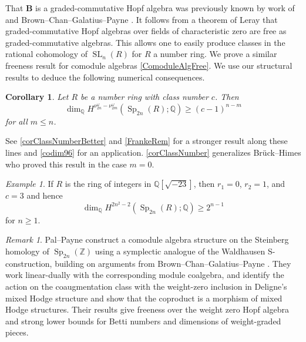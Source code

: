 \documentclass[11pt,letterpaper]{amsart}
\DeclareMathOperator{\Sp}{Sp}
\newcommand{\HH}{\mathbf{B}}
\newcommand{\Q}{\mathbb{Q}}
\numberwithin{theoremcounter}{section}
\newtheorem{corollary}[corollaryauto]{Corollary}
\theoremstyle{definition}
\theoremstyle{remark}
\newtheorem{example}[exampleauto]{Example}
\newtheorem{remark}[remarkauto]{Remark}
\DeclareMathOperator{\SL}{SL}
\begin{document}
That $\HH$ is a graded-commutative Hopf algebra was previously known by work of \cite{AMP} and Brown--Chan--Galatius--Payne \cite{BCGP}. It follows from a theorem of Leray that graded-commutative Hopf algebras over fields of characteristic zero are free as graded-commutative algebras. This allows one to easily produce classes in the rational cohomology of $\SL_n(R)$ for $R$ a number ring. We prove a similar freeness result for comodule algebras \autoref{ComoduleAlgFree}. We use our structural results to deduce the following numerical consequences. 



\begin{corollary} \label{corClassNumber} Let $R$ be a number ring with class number $c$. Then $$\dim_{\Q} H^{\nu_{2n}^\omega -\nu^\omega_{2m}}(\Sp_{2n}(R);\Q) \geq (c-1)^{n-m}$$ for all $m \leq n$.



     
     
\end{corollary}

See \autoref{corClassNumberBetter} and \autoref{FrankeRem} for a stronger result along these lines and \autoref{codim96} for an application.
\autoref{corClassNumber} generalizes Br\"uck--Himes \cite[Theorem 1.1]{BH} who proved this result in the case $m=0$. 

\begin{example}
    If $R$ is the ring of integers in $\Q[\sqrt{-23}]$, then $r_1=0$, $r_2=1$, and $c=3$ and hence 
$$\dim_\Q H^{2n^2-2}(\Sp_{2n}(R);\Q) \geq 2^{n-1}$$ for $n \geq 1$. 
\end{example}

\begin{remark}
    Pal--Payne \cite{PalPayne} construct a comodule algebra structure on the Steinberg homology of $\Sp_{2n}(\mathbb{Z})$ using a symplectic analogue of the Waldhausen S-construction, building on arguments from Brown--Chan--Galatius--Payne \cite{BCGP}. They work linear-dually with the corresponding module coalgebra, and identify the action on the coaugmentation class with the weight-zero inclusion in Deligne’s mixed Hodge structure and show that the coproduct is a morphism of mixed Hodge structures. Their results give freeness over the weight zero Hopf algebra and strong lower bounds for Betti numbers and dimensions of weight-graded pieces.
\end{remark}
\end{document}
